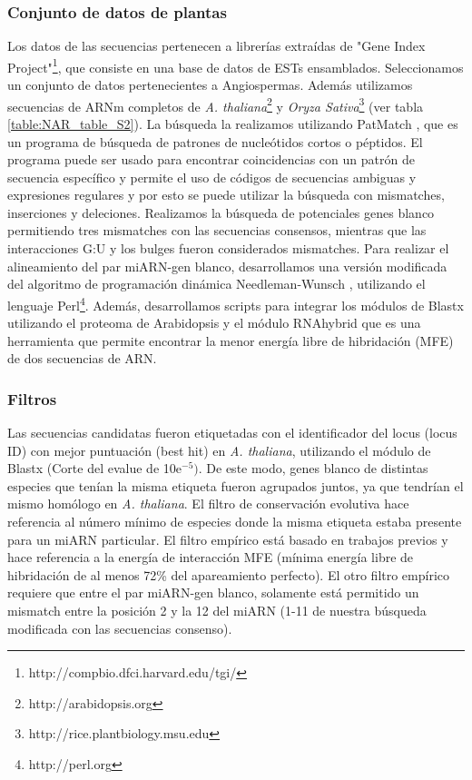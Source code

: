\subsubsection{Conjunto de datos de plantas}
Los datos de las secuencias pertenecen a librerías extraídas de "Gene Index Project"\footnote{http://compbio.dfci.harvard.edu/tgi/}, que consiste en una base de datos de ESTs ensamblados.
Seleccionamos un conjunto de datos pertenecientes a Angiospermas.
Además utilizamos secuencias de ARNm completos de \textit{A. thaliana}\footnote{http://arabidopsis.org} y \textit{Oryza Sativa}\footnote{http://rice.plantbiology.msu.edu} (ver tabla \ref{table:NAR_table_S2}).
La búsqueda la realizamos utilizando PatMatch \citep{Yan01072005}, que es un programa de búsqueda de patrones de nucleótidos cortos o péptidos.
El programa puede ser usado para encontrar coincidencias con un patrón de secuencia específico y permite el uso de códigos de secuencias ambiguas y expresiones regulares y por esto se puede utilizar la búsqueda con mismatches, inserciones y deleciones.
Realizamos la búsqueda de potenciales genes blanco permitiendo tres mismatches con las secuencias consensos, mientras que las interacciones G:U y los bulges fueron considerados mismatches.
Para realizar el alineamiento del par miARN-gen blanco, desarrollamos una versión modificada del algoritmo de programación dinámica Needleman-Wunsch \citep{Needleman1970443}, utilizando el lenguaje Perl\footnote{http://perl.org}.
Además, desarrollamos scripts para integrar los módulos de Blastx \citep{Altschup1990} utilizando el proteoma de Arabidopsis y el módulo RNAhybrid \citep{Giegerich2004} que es una herramienta que permite encontrar la menor energía libre de hibridación (MFE) de dos secuencias de ARN.

\subsubsection{Filtros}
Las secuencias candidatas fueron etiquetadas con el identificador del locus (locus ID) con mejor puntuación (best hit) en \textit{A. thaliana}, utilizando el módulo de Blastx (Corte del evalue de 10e$^{-5})$.
De este modo, genes blanco de distintas especies que tenían la misma etiqueta fueron agrupados juntos, ya que tendrían el mismo homólogo en \textit{A. thaliana}.
El filtro de conservación evolutiva hace referencia al número mínimo de especies donde la misma etiqueta estaba presente para un miARN particular.
El filtro empírico está basado en trabajos previos \citep{Schwab2005517} y hace referencia a la energía de interacción MFE (mínima energía libre de hibridación de al menos 72\% del apareamiento perfecto).
El otro filtro empírico requiere que entre el par miARN-gen blanco, solamente está permitido un mismatch entre la posición 2 y la 12 del miARN (1-11 de nuestra búsqueda modificada con las secuencias consenso).

